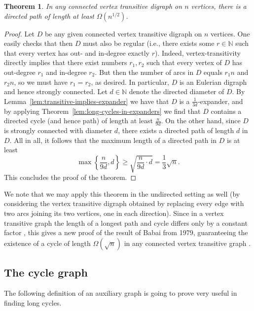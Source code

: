 \documentclass[english,11pt]{article}
\newtheorem{theorem}{Theorem}[section]
\theoremstyle{definition}
\numberwithin{equation}{section}
\numberwithin{figure}{section}
\begin{document}
\begin{theorem}\label{thm:paths-long}
    In any connected vertex transitive digraph on $n$ vertices, there is a directed path of length at least $\Omega(n^{1/2})$.
\end{theorem}

\begin{proof}
Let $D$ be any given connected vertex transitive digraph on $n$ vertices. One easily checks that then $D$ must also be regular (i.e., there exists some $r\in \mathbb{N}$ such that every vertex has out- and in-degree exactly $r$). Indeed, vertex-transitivity directly implies that there exist numbers $r_1, r_2$ such that every vertex of $D$ has out-degree $r_1$ and in-degree $r_2$. But then the number of arcs in $D$ equals $r_1n$ and $r_2n$, so we must have $r_1=r_2$, as desired. In particular, $D$ is an Eulerian digraph and hence strongly connected. Let $d\in \mathbb{N}$ denote the directed diameter of $D$. By Lemma~\ref{lem:transitive-implies-expander} we have that $D$ is a $\frac{1}{3d}$-expander, and by applying Theorem~\ref{lem:long-cycles-in-expanders} we find that $D$ contains a directed cycle (and hence path) of length at least $\frac{n}{9d}$. On the other hand, since $D$ is strongly connected with diameter $d$, there exists a directed path of length $d$ in $D$. All in all, it follows that the maximum length of a directed path in $D$ is at least 
$$\max\left\{\frac{n}{9d},d\right\}\ge \sqrt{\frac{n}{9d}\cdot d}=\frac{1}{3}\sqrt{n}.$$ This concludes the proof of the theorem.
\end{proof}


We note that we may apply this theorem in the undirected setting as well (by considering the vertex transitive digraph obtained by replacing every edge with two arcs joining its two vertices, one in each direction). Since in a vertex transitive graph the length of a longest path and cycle differs only by a constant factor \cite{path-vs-cycle}, this gives a new proof of the result of Babai from 1979, guaranteeing the existence of a cycle of length $\Omega(\sqrt{n})$ in any connected vertex transitive graph \cite{babai}. 

\subsection{The cycle graph}\label{subs:cycle-graph}

The following definition of an auxiliary graph is going to prove very useful in finding long cycles.
\end{document}
